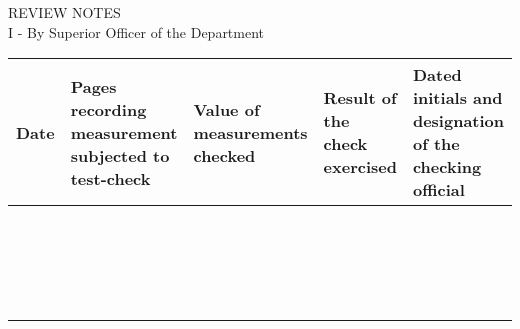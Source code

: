 \documentclass[a4paper,10pt]{article}
\begin{document}
\begin{titlepage}
    \vspace*{\fill}
    \bf
	\begin{center}
	    REVIEW NOTES \\
	    I - By Superior Officer of the Department \\
	\end{center}
	
	\begin{longtabu} to \textwidth {|X[5,l]|X[10,l]|X[10,l]|X[10,l]|X[10,l]|}
	    \hline
	    Date & Pages recording measurement subjected to test-check & Value of measurements checked & Result of the check exercised & Dated initials and designation of the checking official \\
	    \hline \hline
	    & & & & \\[0.2cm] \hline
	    & & & & \\[0.2cm] \hline
	    & & & & \\[0.2cm] \hline
	    & & & & \\[0.2cm] \hline
	    & & & & \\[0.2cm] \hline
	    & & & & \\[0.2cm] \hline
	    & & & & \\[0.2cm] \hline
	    & & & & \\[0.2cm] \hline
	    & & & & \\[0.2cm] \hline
	    & & & & \\[0.2cm] \hline
	    & & & & \\[0.2cm] \hline
	    & & & & \\[0.2cm] \hline
	    & & & & \\[0.2cm] \hline
	    & & & & \\[0.2cm] \hline
	    & & & & \\[0.2cm] \hline
	    & & & & \\[0.2cm] \hline
	    & & & & \\[0.2cm] \hline
	    & & & & \\[0.2cm] \hline
	    & & & & \\[0.2cm] \hline
	\end{longtabu}
	
    \vspace*{\fill}
\end{titlepage}

\newpage
\end{document}
